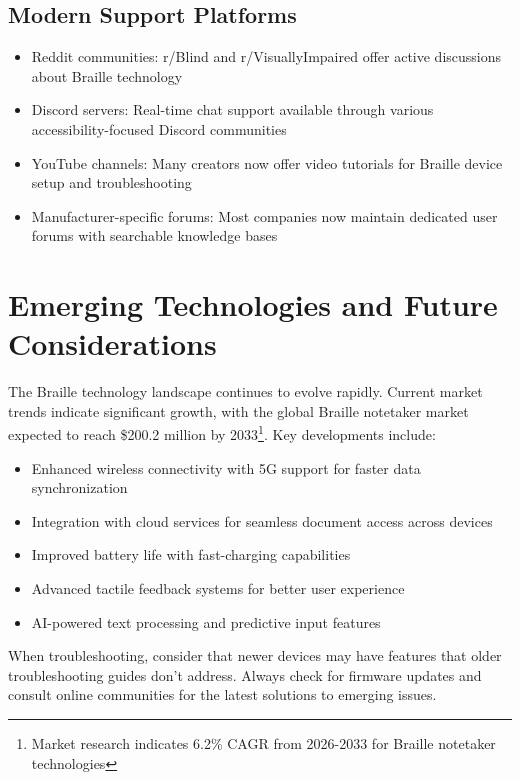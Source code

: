 \subsection{Modern Support Platforms}
\begin{itemize}
 \item Reddit communities: r/Blind and r/VisuallyImpaired offer active discussions about Braille technology
 \item Discord servers: Real-time chat support available through various accessibility-focused Discord communities
 \item YouTube channels: Many creators now offer video tutorials for Braille device setup and troubleshooting
 \item Manufacturer-specific forums: Most companies now maintain dedicated user forums with searchable knowledge bases
\end{itemize}

\section{Emerging Technologies and Future Considerations}\label{emerging}
The Braille technology landscape continues to evolve rapidly. Current market trends indicate significant growth, with the global Braille notetaker market expected to reach \$200.2 million by 2033\footnote{\raggedright Market research indicates 6.2\% CAGR from 2026-2033 for Braille notetaker technologies}. Key developments include:

\begin{itemize}
 \item Enhanced wireless connectivity with 5G support for faster data synchronization
 \item Integration with cloud services for seamless document access across devices
 \item Improved battery life with fast-charging capabilities
 \item Advanced tactile feedback systems for better user experience
 \item AI-powered text processing and predictive input features
\end{itemize}

When troubleshooting, consider that newer devices may have features that older troubleshooting guides don't address. Always check for firmware updates and consult online communities for the latest solutions to emerging issues.
